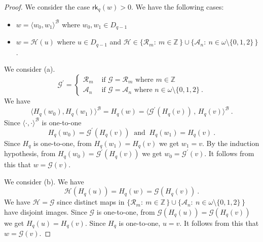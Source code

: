 \documentclass[10pt,a4paper, openany,  oldfontcommands]{memoir}
\newtheorem{open problem} [theorem] {Open Problem}
\newtheorem{open question} [theorem] {Open Question}
\begin{document}
\begin{proof}
  
  
  
  
  
  We consider the case    $    \mathsf{rk}_q  \left(  w  \right)   >  0 $. 
  We have the following cases: 
  \begin{itemize}
  \item[(a)]  $  w  =  \langle  w_0,  w_1  \rangle^{  \mathcal{B}  }  $  where  $  w_0,  w_1  \in  D_{ q-1}  $
  
  
  \item[(b)]  $  w  =  \mathcal{H} \left( u  \right)   $   where  $  u \in D_{ q-1}  $  and  
  $  \mathcal{H}  \in     \lbrace  \mathcal{R}_m  :   \   m  \in  \mathbb{Z}  \,   \rbrace   \cup  
       \lbrace  \mathcal{A}_n  :   \     n   \in  \omega  \setminus  \lbrace 0, 1,  2  \rbrace    \,   \rbrace      \,      $.
\end{itemize}    
We consider (a). 
\[
\mathcal{G}^{  \prime  }  =  \begin{cases}
\mathcal{R}_m    &    \mbox{  if  }   \mathcal{G}  =  \mathcal{R}_m  \mbox{  where  }   m  \in  \mathbb{Z}
\\
\mathcal{A}_n    &    \mbox{  if  }   \mathcal{G}  =  \mathcal{A}_n   \mbox{  where  }   n  \in  \omega  \setminus  \lbrace 0, 1,  2  \rbrace 
\     .
\end{cases}
\]
We have 
\[
\langle  H_q  (w_0)  ,  H_q (w_1)   \rangle^{  \mathcal{B}  }    =  
H_q  (w)    =  
\langle   \mathcal{G}^{  \prime  }   \left(  H_q (v)  \right)    \,   ,  \,    H_q (v)    \rangle^{  \mathcal{B}  } 
\       .
\]
Since  $  \langle  \cdot  ,  \cdot  \rangle^{  \mathcal{B}  }   $  is one-to-one
\[
 H_q  (w_0)    =    \mathcal{G}^{  \prime  }   \left(  H_q (v)  \right)       \     \mbox{  and  }    \   
 H_q (w_1)     =   H_q (v)   
 \   .
\]
Since  $  H_q  $  is one-to-one,  from   $   H_q (w_1)     =   H_q (v)    $  we get  $  w_1  =  v  $. 
By the induction hypothesis,  from  $   H_q  (w_0)    =    \mathcal{G}^{  \prime  }   \left(  H_q (v)  \right)    $  we get 
$  w_0  =    \mathcal{G}^{  \prime  }   \left(  v  \right)   $. 
It follows from this that    $  w  =  \mathcal{G}  \left(    v  \right)     $.






We consider (b). 
We have 
\[
\mathcal{H}  \left(  H_q (u)  \right)    =  H_q (w)   =     \mathcal{G}  \left(    H_q (v)   \right)    
\      .
\]
We have  $  \mathcal{H}   =  \mathcal{G}   $  since distinct maps in 
$  \lbrace  \mathcal{R}_m  :   \   m  \in  \mathbb{Z}  \,   \rbrace   \cup  
       \lbrace  \mathcal{A}_n  :   \     n   \in  \omega  \setminus  \lbrace 0, 1,  2  \rbrace    \,   \rbrace    $
       have disjoint images. 
 Since      $  \mathcal{G}   $ is one-to-one, 
 from     $  \mathcal{G}  \left(  H_q (u)  \right)    =  \mathcal{G}  \left(    H_q (v)   \right)      $  
 we get  $  H_q (u)   =  H_q (v)   $.
 Since  $  H_q  $  is one-to-one,   $  u  =  v  $. 
 It follows from this that    $  w  =  \mathcal{G}  \left(    v  \right)     $.
\end{proof}
\end{document}
